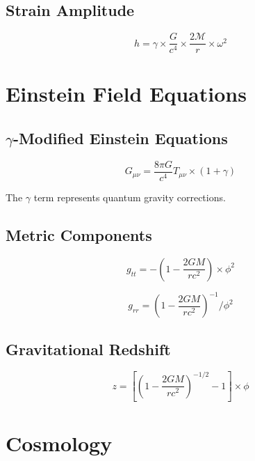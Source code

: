 \documentclass[12pt,a4paper]{article}
\begin{document}
\subsection{Strain Amplitude}

\begin{equation}
h = \gamma \times \frac{G}{c^4} \times \frac{2\mathcal{M}}{r} \times \omega^2
\end{equation}

\section{Einstein Field Equations}

\subsection{$\gamma$-Modified Einstein Equations}

\begin{equation}
G_{\mu\nu} = \frac{8\pi G}{c^4} T_{\mu\nu} \times (1 + \gamma)
\end{equation}

The $\gamma$ term represents quantum gravity corrections.

\subsection{Metric Components}

\begin{equation}
g_{tt} = -\left(1 - \frac{2GM}{rc^2}\right) \times \phi^2
\end{equation}

\begin{equation}
g_{rr} = \left(1 - \frac{2GM}{rc^2}\right)^{-1} / \phi^2
\end{equation}

\subsection{Gravitational Redshift}

\begin{equation}
z = \left[\left(1 - \frac{2GM}{rc^2}\right)^{-1/2} - 1\right] \times \phi
\end{equation}

\section{Cosmology}
\end{document}
